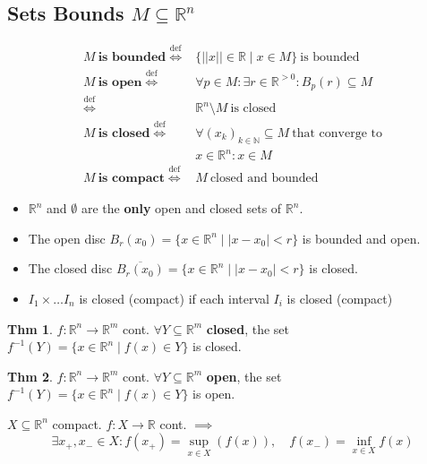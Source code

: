 \documentclass[a4paper, 10pt]{article}
\theoremstyle{definition}
\newtheorem*{theorem}{Thm}
\newcommand{\R}{\mathbb{R}}
\newcommand{\N}{\mathbb{N}}
\newcommand{\defi}{\stackrel{\text{def}}{\iff}}
\begin{document}
\subsection*{Sets Bounds \(M \subseteq \R^n\)}
\vspace{-8pt}
\begin{align*}
    M \ \textbf{is bounded} \defi & \{||x|| \in \R \mid x \in M\} \ \text{is bounded} \\
    M \ \textbf{is open} \defi & \forall p \in M: \exists r \in \R^{>0}: B_p(r) \subseteq M \\
    \defi & \R^n \setminus M \ \text{is closed}\\
    M \ \textbf{is closed} \defi & \forall (x_k)_{k \in \N} \subseteq M \ \text{that converge to} \\
    & x \in \R^n: x \in M \\
    M \ \textbf{is compact} \defi& M \ \text{closed and bounded}
\end{align*}

\begin{note*}
    \begin{itemize}
        \item \(\R^n\) and \(\emptyset\) are the \textbf{only} open and  closed sets of \(\R^n\).
        \item The open disc \(B_r(x_0) = \{x \in \R^n \mid |x - x_0| < r\}\) is bounded and open.
        \item The closed disc \(\overline{B_r(x_0)} = \{x \in \R^n \mid |x - x_0| < r\}\) is closed.
        \item \(I_1 \times \ldots I_n\) is closed (compact) if each interval \(I_i\) is closed (compact)
    \end{itemize}
\end{note*}

\begin{theorem}
    \(f: \R^n \to \R^m\) cont. \(\forall Y \subseteq \R^m\) \textbf{closed}, the set \(f^{-1}(Y) = \{x \in \R^n \mid f(x) \in Y\}\) is closed.
\end{theorem}

\begin{theorem}
    \(f: \R^n \to \R^m\) cont. \(\forall Y \subseteq \R^m\) \textbf{open}, the set \(f^{-1}(Y) = \{x \in \R^n \mid f(x) \in Y\}\) is open.
\end{theorem}

\begin{ntheorem*}
    \(X \subseteq \R^n\) compact. \(f: X \to \R\) cont. \(\implies\)
    \[\exists x_+, x_- \in X: f(x_+) = \sup_{x \in X}(f(x)), \quad f(x_-) = \inf_{x \in X} f(x)\]
\end{ntheorem*}
\end{document}
